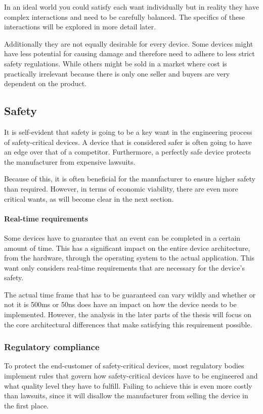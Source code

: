 In an ideal world you could satisfy each want individually but in reality they have complex interactions and need to be carefully balanced. The specifics of these interactions will be explored in more detail later.

Additionally they are not equally desirable for every device. Some devices might have less potential for causing damage and therefore need to adhere to less strict safety regulations. While others might be sold in a market where cost is practically irrelevant because there is only one seller and buyers are very dependent on the product. 

\subsection{Safety}
It is self-evident that safety is going to be a key want in the engineering process of safety-critical devices. A device that is considered safer is often going to have an edge over that of a competitor. Furthermore, a perfectly safe device protects the manufacturer from expensive lawsuits.

Because of this, it is often beneficial for the manufacturer to ensure higher safety than required. However, in terms of economic viability, there are even more critical wants, as will become clear in the next section.

\paragraph{Real-time requirements}
Some devices have to guarantee that an event can be completed in a certain amount of time. This has a significant impact on the entire device architecture, from the hardware, through the operating system to the actual application. This want only considers real-time requirements that are necessary for the device's safety.

The actual time frame that has to be guaranteed can vary wildly and whether or not it is 500ms or 50ns does have an impact on how the device needs to be implemented. However, the analysis in the later parts of the thesis will focus on the core architectural differences that make satisfying this requirement possible. 

\subsubsection{Regulatory compliance}
To protect the end-customer of safety-critical devices, most regulatory bodies implement rules that govern how safety-critical devices have to be engineered and what quality level they have to fulfill.
Failing to achieve this is even more costly than lawsuits, since it will disallow the manufacturer from selling the device in the first place. 

